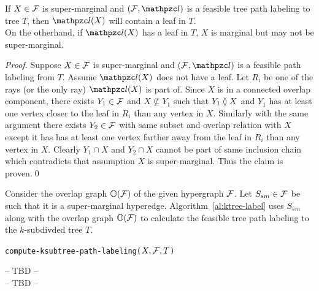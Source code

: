 \documentclass[MS]             %
              {iitmdiss_as}    %
\begin{document}
\begin{lemma}
  \label{lem:sup-mar}
  If $X \in {\cal F}$ is super-marginal and $(\cF, \cl)$ is a feasible
  tree path labeling to tree $T$, then $\cl(X)$ will
  contain a leaf in $T$.\\
  On the otherhand, if $\cl(X)$ has a leaf in
  $T$, $X$ is marginal but may not be super-marginal.
\end{lemma}
\begin{proof}
  Suppose $X \in {\cal F}$ is super-marginal and $(\cF, \cl)$ is a feasible
  path labeling from $T$.  Assume $\cl(X)$ does not have a leaf.  Let
  $R_i$ be one of the rays (or the only ray) $\cl(X)$ is part of.
  Since $X$ is in a connected overlap component, there exists $Y_1 \in
  {\cal F}$ and $X \nsubseteq Y_1$ such that $Y_1 \between X$ and $Y_1$ has
  at least one vertex closer to the leaf in $R_i$ than any vertex in
  $X$. Similarly with the same argument there exists $Y_2 \in {\cal F}$
  with same subset and overlap relation with $X$ except it has has at
  least one vertex farther away from the leaf in $R_i$ than any vertex
  in $X$. Clearly $Y_1 \cap X$ and $Y_2 \cap X$ cannot be part of same
  inclusion chain which contradicts that assumption $X$ is
  super-marginal. Thus the claim is proven.\qed
\end{proof}

\noindent
Consider the overlap graph $\mathbb O({\cal F})$ of the given hypergraph
${\cal F}$. Let $S_{sm} \in {\cal F}$ be such that it is a super-marginal
hyperedge.  Algorithm~\ref{al:ktree-label} uses $S_{sm}$ along with
the overlap graph $\mathbb O({\cal F})$ to calculate the feasible tree path
labeling to the $k$-subdivded tree $T$.

\begin{algorithm}[h]
  \caption{{\tt compute-ksubtree-path-labeling($X, {\cal F}, T$)}}
  \label{al:ktree-label}
  \begin{algorithmic}[\lndisplay]
    \STATE -- TBD --\\
    \ELSE 
    \STATE -- TBD --\\
    \ENDIF

 \end{algorithmic}
\end{algorithm}



\end{document}
